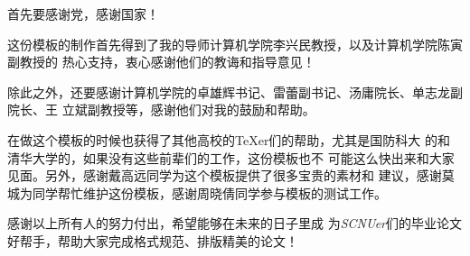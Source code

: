 

\begin{ack}

  首先要感谢党，感谢国家！
  
  这份模板的制作首先得到了我的导师计算机学院李兴民教授，以及计算机学院陈寅副教授的
  热心支持，衷心感谢他们的教诲和指导意见！

  除此之外，还要感谢计算机学院的卓雄辉书记、雷蕾副书记、汤庸院长、单志龙副院长、王
  立斌副教授等，感谢他们对我的鼓励和帮助。

  在做这个模板的时候也获得了其他高校的\TeX{}er们的帮助，尤其是国防科大
  的\nudtpaper{}和清华大学的\thuthesis{}，如果没有这些前辈们的工作，这份模板也不
  可能这么快出来和大家见面。另外，感谢戴高远同学为这个模板提供了很多宝贵的素材和
  建议，感谢莫城为同学帮忙维护这份模板，感谢周晓倩同学参与模板的测试工作。

  感谢以上所有人的努力付出，希望\scnuthesis{}能够在未来的日子里成
  为\textit{SCNUer}们的毕业论文好帮手，帮助大家完成格式规范、排版精美的论文！

\end{ack}

